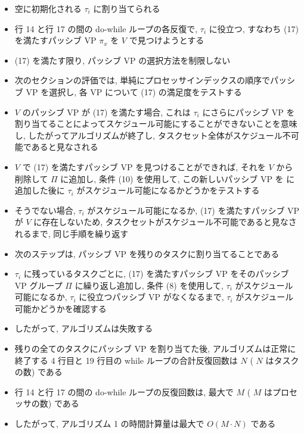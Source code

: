 \begin{frame}{}
    \begin{itemize}
        \item 空に初期化される $\tau_{i}$ に割り当てられる
\item 行 14 と行 17 の間の do-while ループの各反復で, $\tau_{i}$ に役立つ, すなわち (17) を満たすパッシブ VP $\pi_{x}$ を $V$ で見つけようとする
\item (17) を満たす限り, パッシブ VP の選択方法を制限しない
\item 次のセクションの評価では, 単純にプロセッサインデックスの順序でパッシブ VP を選択し, 各 VP について (17) の満足度をテストする
\item $V$ のパッシブ VP が (17) を満たす場合, これは $\tau_{i}$ にさらにパッシブ VP を割り当てることによってスケジュール可能にすることができないことを意味し, したがってアルゴリズムが終了し, タスクセット全体がスケジュール不可能であると見なされる
\item $V$ で (17) を満たすパッシブ VP を見つけることができれば, それを $V$ から削除して $\Pi$ に追加し, 条件 (10) を使用して, この新しいパッシブ VP を に追加した後に $\tau_{i}$ がスケジュール可能になるかどうかをテストする
\item そうでない場合, $\tau_{i}$ がスケジュール可能になるか, (17) を満たすパッシブ VP が $V$ に存在しないため, タスクセットがスケジュール不可能であると見なされるまで, 同じ手順を繰り返す
    \end{itemize}
\end{frame}

\begin{frame}{}
    \begin{itemize}
        \item 次のステップは, パッシブ VP を残りのタスクに割り当てることである
\item $\tau_{i}$ に残っているタスクごとに, (17) を満たすパッシブ VP をそのパッシブ VP グループ $\Pi$ に繰り返し追加し, 条件 (8) を使用して, $\tau_{i}$ がスケジュール可能になるか, $\tau_{i}$ に役立つパッシブ VP がなくなるまで, $\tau_{i}$ がスケジュール可能かどうかを確認する
\item したがって, アルゴリズムは失敗する
\item 残りの全てのタスクにパッシブ VP を割り当てた後, アルゴリズムは正常に終了する 4 行目と 19 行目の while ループの合計反復回数は $N$ ( $N$ はタスクの数) である
\item 行 14 と行 17 の間の do-while ループの反復回数は, 最大で $M$ ( $M$ はプロセッサの数) である
\item したがって, アルゴリズム 1 の時間計算量は最大で $O(M \cdot N)$ である
    \end{itemize}
\end{frame}

